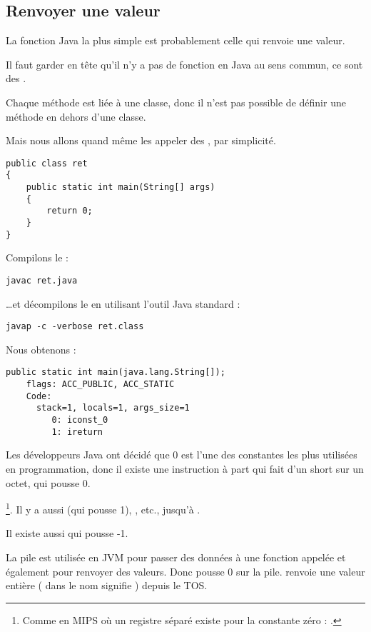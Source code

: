 \subsection{Renvoyer une valeur}

La fonction Java la plus simple est probablement celle qui renvoie une valeur.

Il faut garder en tête qu'il n'y a pas de fonction  en Java au sens commun,
ce sont des .

Chaque méthode est liée à une classe, donc il n'est pas possible de définir
une méthode en dehors d'une classe.

Mais nous allons quand même les appeler des , par simplicité.

\begin{lstlisting}[style=customjava]
public class ret
{
	public static int main(String[] args) 
	{
		return 0;
	}
}
\end{lstlisting}

Compilons le :

\begin{lstlisting}
javac ret.java
\end{lstlisting}

\dots et décompilons le en utilisant l'outil Java standard :

\begin{lstlisting}
javap -c -verbose ret.class
\end{lstlisting}

Nous obtenons :

\begin{lstlisting}[caption=JDK 1.7 (excerpt)]
  public static int main(java.lang.String[]);
    flags: ACC_PUBLIC, ACC_STATIC
    Code:
      stack=1, locals=1, args_size=1
         0: iconst_0      
         1: ireturn       
\end{lstlisting}

Les développeurs Java ont décidé que 0 est l'une des constantes les plus utilisées en programmation,
donc il existe une instruction à part qui fait d'un short sur un octet,  qui pousse 0.

\footnote{Comme en MIPS où un registre séparé existe pour la constante zéro : .}.
Il y a aussi  (qui pousse 1), , etc., jusqu'à .

Il existe aussi  qui pousse -1.

La pile est utilisée en JVM pour passer des données à une fonction appelée et également pour renvoyer des valeurs.
Donc  pousse 0 sur la pile.
 renvoie une valeur entière ( dans le nom signifie ) depuis le \ac{TOS}.

